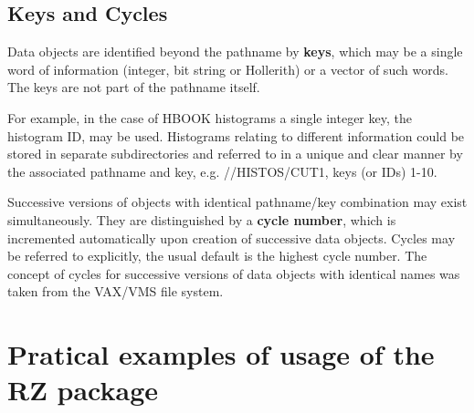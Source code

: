 \subsection{Keys and Cycles}
\par Data objects are identified beyond the pathname by {\bf keys},
which may be a single word of information
(integer, bit string or Hollerith)
or a vector of such words. The keys are not part of the pathname itself.
\par
For example, in the case of HBOOK histograms a single integer
key, the histogram ID, may be used. Histograms relating to different
information could be stored in separate subdirectories and referred
to in a unique and clear manner by the associated pathname and
key, e.g. //HISTOS/CUT1, keys (or IDs) 1-10.
\par Successive versions of objects with identical
pathname/key combination may exist simultaneously.
They are distinguished by a {\bf cycle number},
which is incremented automatically upon creation of successive data
objects. Cycles may be referred to explicitly,
the usual default is the highest cycle number.
The concept of cycles for successive versions of data objects with
identical names was taken from the VAX/VMS file system.
\section{Pratical examples of usage of the RZ package}
